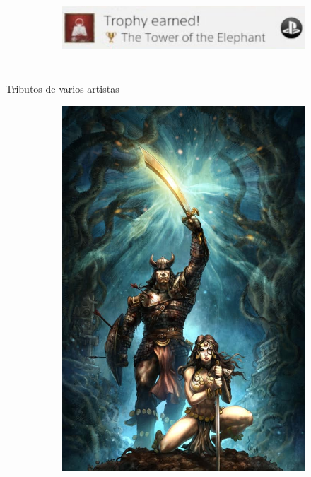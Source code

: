 \begin{frame}{}
\begin{columns}
\begin{figure}[htp]
\begin{subfigure}[b]{0.3\textwidth}
			\end{subfigure}
			\\
			\begin{subfigure}[b]{0.6\textwidth}
				\includegraphics[width=\textwidth]{img/otros/trofeo}
			\end{subfigure}
		\end{figure}
	\end{columns}
\end{frame}
\note[itemize]{
	\item
}

\begin{frame}{Tributos de varios artistas}
	\begin{figure}[htp]
		\centering
		\begin{subfigure}[b]{0.22\textwidth}
			\includegraphics[width=\textwidth]{img/tributos/AlanQuah}

\end{subfigure}
\end{figure}
\end{frame}
